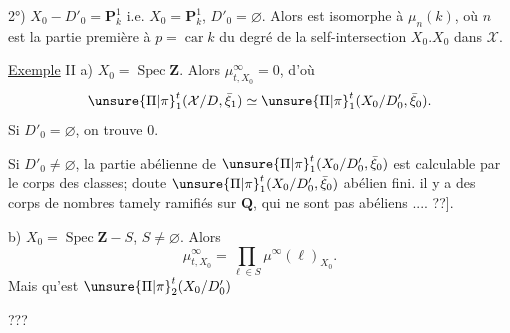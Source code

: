 2°) $\boxed{X_0-D'_0=\mathbf{P}^1_k}$ i.e. $X_0=\mathbf{P}^1_k$, $D'_0=\varnothing$. Alors  est  isomorphe à $\mu_n(k)$, où $n$ est la partie première à $p=\operatorname{car}k$ du degré de la self-intersection $X_0.X_0$ dans $\mathcal{X}$.

\uline{Exemple} II a) $X_0=\operatorname{Spec}\mathbf{Z}$. Alors $\mu_{t,X_0}^\infty=0$,
d'où
\[
\unsure{\Pi|\pi}_1^t(\mathcal{X}/D,\bar\xi_1)\simeq\unsure{\Pi|\pi}_1^t(X_0/D'_0,\bar\xi_0).
\]
 Si $D'_0=\varnothing$, on trouve $0$.

Si $D'_0\ne\varnothing$, la partie abélienne de $\unsure{\Pi|\pi}_1^t(X_0/D'_0,\bar\xi_0)$ est calculable par le corps des classes;  doute $\unsure{\Pi|\pi}_1^t(X_0/D'_0,\bar\xi_0)$   abélien fini. il y a des  corps de nombres tamely ramifiés sur $\mathbf{Q}$, qui ne sont pas abéliens .... ??].

b) $X_0=\operatorname{Spec}\mathbf{Z}-S$, $S\ne\varnothing$. Alors
\[
\mu_{t,X_0}^\infty=\prod_{\ell\in S}\mu^\infty(\ell)_{X_0}.
\]
Mais qu'est $\unsure{\Pi|\pi}_2^t(X_0/D'_0)$

???
